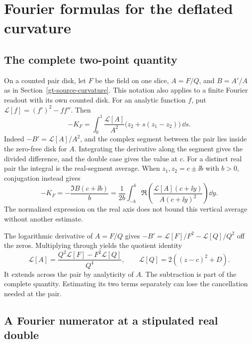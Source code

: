 \section{Fourier formulas for the deflated curvature}
\label{gt-fourier-curvature}

\subsection{The complete two-point quantity}

On a counted pair disk, let \(F\) be the field on one slice,
\(A=F/Q\), and \(B=A'/A\) as in
Section~\ref{gt-source-curvature}. This notation also applies to
a finite Fourier readout with its own counted disk. For an analytic
function \(f\), put \(\mathcal L[f]=(f')^2-ff''\). Then
\begin{equation}
 -K_F=\int_0^1
 \frac{\mathcal L[A]}{A^2}\bigl(z_2+s(z_1-z_2)\bigr)\,\dd s .
 \label{gt-deflated-curvature}
\end{equation}
Indeed \(-B'=\mathcal L[A]/A^2\), and the complex segment between
the pair lies inside the zero-free disk for \(A\). Integrating the
derivative along the segment gives the divided difference, and
the double case gives the value at \(c\). For a distinct real pair
the integral is the real-segment average. When \(z_1,z_2=c\pm\ii b\)
with \(b>0\), conjugation instead gives
\begin{equation}
 -K_F=-\frac{\Im B(c+\ii b)}{b}
 =\frac1{2b}\int_{-b}^{b}
  \Re\!\left(\frac{\mathcal L[A](c+\ii y)}{A(c+\ii y)^2}\right)\dd y .
 \label{gt-vertical-curvature}
\end{equation}
The normalized expression on the real axis does not bound this
vertical average without another estimate.

The logarithmic derivative of \(A=F/Q\) gives
\(-B'=\mathcal L[F]/F^2-\mathcal L[Q]/Q^2\) off the zeros.
Multiplying through yields the quotient identity
\begin{equation}
 \mathcal L[A]=\frac{Q^2\mathcal L[F]-F^2\mathcal L[Q]}{Q^4},
 \qquad \mathcal L[Q]=2((z-c)^2+D).
 \label{gt-curvature-quotient}
\end{equation}
It extends across the pair by analyticity of \(A\).
The subtraction is part of the complete quantity. Estimating
its two terms separately can lose the cancellation needed at
the pair.

\subsection{A Fourier numerator at a stipulated real double}

